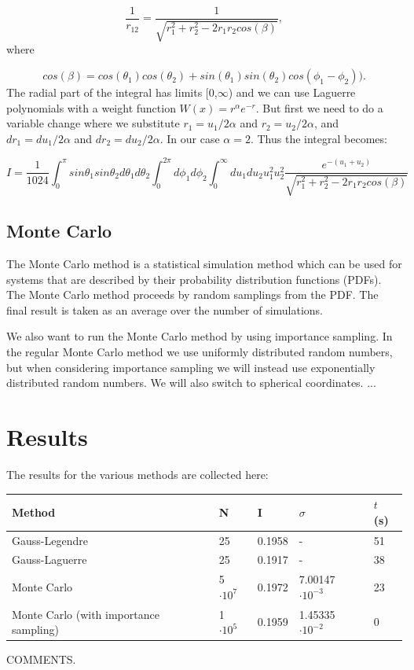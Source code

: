\documentclass{article}
\begin{document}
\begin{equation*}
	\frac{1}{r_{12}}= \frac{1}{\sqrt{r_1^2+r_2^2-2r_1r_2cos(\beta)}},
\end{equation*}
where

\begin{equation*}
	cos(\beta) = cos(\theta_1)cos(\theta_2)+sin(\theta_1)sin(\theta_2)cos(\phi_1-\phi_2)).
\end{equation*}
The radial part of the integral has limits [0,$\infty$) and we can use Laguerre polynomials with a weight function $W(x) = r^{\alpha} e^{-r}$. But first we need to do a variable change where we substitute $r_1 = u_1/2\alpha$ and $r_2 = u_2/2\alpha$, and $dr_1 = du_1/2\alpha$ and $dr_2 = du_2/2\alpha$. In our case $\alpha = 2$. Thus the integral becomes:

\begin{equation}
	I = \frac{1}{1024} \int_0^{\pi} sin \theta_1 sin \theta_2 d\theta_1 d\theta_2 
	\int_0^{2\pi} d\phi_1d\phi_2
	\int_0^{\infty}   du_1  du_2 u_1^2 u_2^2 \frac{e^{- (u_1 + u_2)}}{\sqrt{r_1^2+r_2^2-2r_1r_2cos(\beta)}}  
\end{equation}



\subsection{Monte Carlo}
The Monte Carlo method is a statistical simulation method which can be used for systems that are described by their probability distribution functions (PDFs). The Monte Carlo method proceeds by random samplings from the PDF. The final result is taken as an average over the number of simulations.

We also want to run the Monte Carlo method by using importance sampling. In the regular Monte Carlo method we use uniformly distributed random numbers, but when considering importance sampling we will instead use exponentially distributed random numbers. We will also switch to spherical coordinates.
... 


\section{Results}
The results for the various methods are collected here:

\begin{center}
\begin{tabular}{ l l l l l}\hline
	Method 									& N	 				&I			&$\sigma$				& $t$ (s) \\ \hline
	Gauss-Legendre 							& 25 					& 0.1958		& -						& 51 \\
	Gauss-Laguerre 							& 25					& 0.1917		& -						& 38 \\
	Monte Carlo 								& 5 $\cdot 10^7$ 		& 0.1972		& 7.00147 $\cdot 10^{-3}$		& 23 \\
	Monte Carlo (with importance sampling) 			& 1 $\cdot 10^5$		& 0.1959		& 1.45335 $\cdot 10^{-2}$		& 0 \\
	\hline
\end{tabular}
\end{center}
COMMENTS.
\end{document}
